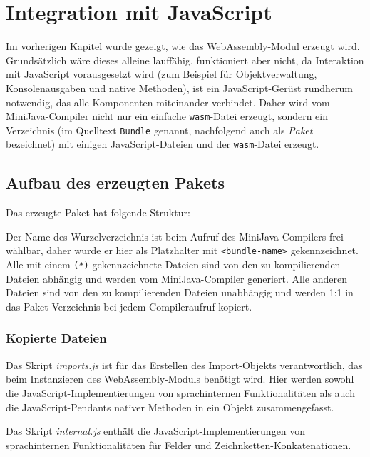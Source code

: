 \chapter{Integration mit JavaScript}
\label{cha:JavaScript-Integration}

Im vorherigen Kapitel wurde gezeigt, wie das WebAssembly-Modul erzeugt wird. Grundsätzlich wäre dieses alleine lauffähig, funktioniert aber nicht, da Interaktion mit Ja\-va\-Script vorausgesetzt wird (zum Beispiel für Objektverwaltung, Konsolenausgaben und native Methoden), ist ein JavaScript-Gerüst rundherum notwendig, das alle Komponenten miteinander verbindet. Daher wird vom MiniJava-Compiler nicht nur ein einfache \lstinline{wasm}-Datei erzeugt, sondern ein Verzeichnis (im Quelltext \lstinline{Bundle} genannt, nachfolgend auch als \emph{Paket} bezeichnet) mit einigen JavaScript-Dateien und der \lstinline{wasm}-Datei erzeugt.

\section{Aufbau des erzeugten Pakets}

Das erzeugte Paket hat folgende Struktur:


Der Name des Wurzelverzeichnis ist beim Aufruf des MiniJava-Compilers frei wählbar, daher wurde er hier als Platzhalter mit \lstinline{<bundle-name>} gekennzeichnet. Alle mit einem \lstinline{(*)} gekennzeichnete Dateien sind von den zu kompilierenden Dateien abhängig und werden vom MiniJava-Compiler generiert. Alle anderen Dateien sind von den zu kompilierenden Dateien unabhängig und werden 1:1 in das Paket-Verzeichnis bei jedem Compileraufruf kopiert.

\subsection{Kopierte Dateien}

Das Skript \emph{imports.js} ist für das Erstellen des Import-Objekts verantwortlich, das beim Instanzieren des WebAssembly-Moduls benötigt wird. Hier werden sowohl die Ja\-va\-Script-Im\-ple\-men\-tie\-rungen von sprachinternen Funktionalitäten als auch die Ja\-va\-Script-Pen\-dants nativer Methoden in ein Objekt zusammengefasst.

Das Skript \emph{internal.js} enthält die JavaScript-Implementierungen von sprachinternen Funktionalitäten für Felder und Zeichnketten-Konkatenationen.


